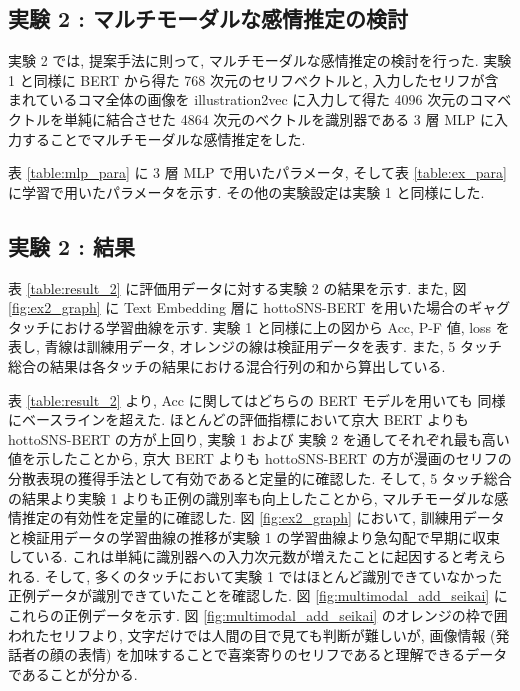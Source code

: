 \newpage
\changeindent{0cm}
\subsection{実験 2 : マルチモーダルな感情推定の検討}
\changeindent{2cm}

実験 2 では, 提案手法に則って, マルチモーダルな感情推定の検討を行った.
実験 1 と同様に BERT から得た 768 次元のセリフベクトルと, 入力したセリフが含まれているコマ全体の画像を illustration2vec に入力して得た 4096 次元のコマベクトルを単純に結合させた 4864 次元のベクトルを識別器である 3 層 MLP に入力することでマルチモーダルな感情推定をした.

表 \ref{table:mlp_para} に 3 層 MLP で用いたパラメータ, そして表 \ref{table:ex_para} に学習で用いたパラメータを示す. その他の実験設定は実験 1 と同様にした.


\changeindent{0cm}
\subsection{実験 2 : 結果}
\changeindent{2cm}

表 \ref{table:result_2} に評価用データに対する実験 2 の結果を示す. また, 図 \ref{fig:ex2_graph} に Text Embedding 層に hottoSNS-BERT を用いた場合のギャグタッチにおける学習曲線を示す. 実験 1 と同様に上の図から Acc, P-F 値, loss を表し, 青線は訓練用データ, オレンジの線は検証用データを表す. また, 5 タッチ総合の結果は各タッチの結果における混合行列の和から算出している.

表 \ref{table:result_2} より, Acc に関してはどちらの BERT モデルを用いても
同様にベースラインを超えた. ほとんどの評価指標において京大 BERT よりも hottoSNS-BERT の方が上回り, 実験 1 および 実験 2 を通してそれぞれ最も高い値を示したことから, 京大 BERT よりも hottoSNS-BERT の方が漫画のセリフの分散表現の獲得手法として有効であると定量的に確認した. そして, 5 タッチ総合の結果より実験 1 よりも正例の識別率も向上したことから, マルチモーダルな感情推定の有効性を定量的に確認した. 図 \ref{fig:ex2_graph} において, 訓練用データと検証用データの学習曲線の推移が実験 1 の学習曲線より急勾配で早期に収束している. これは単純に識別器への入力次元数が増えたことに起因すると考えられる. そして, 多くのタッチにおいて実験 1 ではほとんど識別できていなかった正例データが識別できていたことを確認した.
図 \ref{fig:multimodal_add_seikai} にこれらの正例データを示す. 図 \ref{fig:multimodal_add_seikai} のオレンジの枠で囲われたセリフより, 文字だけでは人間の目で見ても判断が難しいが, 画像情報 (発話者の顔の表情) を加味することで喜楽寄りのセリフであると理解できるデータであることが分かる.

